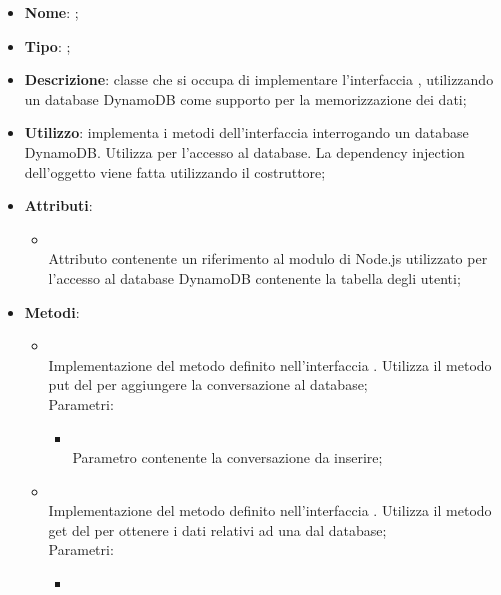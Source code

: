 \begin{itemize}
	\item \textbf{Nome}: ;
	\item \textbf{Tipo}: ;
	\item \textbf{Descrizione}: classe che si occupa di implementare l'interfaccia , utilizzando un database DynamoDB come supporto per la memorizzazione dei dati;
	\item \textbf{Utilizzo}: implementa i metodi dell'interfaccia  interrogando un database DynamoDB. Utilizza  per l'accesso al database. La dependency injection dell'oggetto  viene fatta utilizzando il costruttore;
	\item \textbf{Attributi}:
	\begin{itemize}
		\item[]  \\
		Attributo contenente un riferimento al modulo di Node.js utilizzato per l'accesso al database DynamoDB contenente la tabella degli utenti;
	\end{itemize}
	\item \textbf{Metodi}:
	\begin{itemize}
		\item[]  \\
		Implementazione del metodo definito nell'interfaccia . Utilizza il metodo put del  per aggiungere la conversazione al database;\\
		Parametri:
		\begin{itemize}
			\item {} \\
			Parametro contenente la conversazione da inserire;
		\end{itemize}
		\item[]  \\
		Implementazione del metodo definito nell'interfaccia . Utilizza il metodo get del  per ottenere i dati relativi ad una  dal database;\\
		Parametri:
		\begin{itemize}
			\item {} \\

\end{itemize}
\end{itemize}
\end{itemize}
